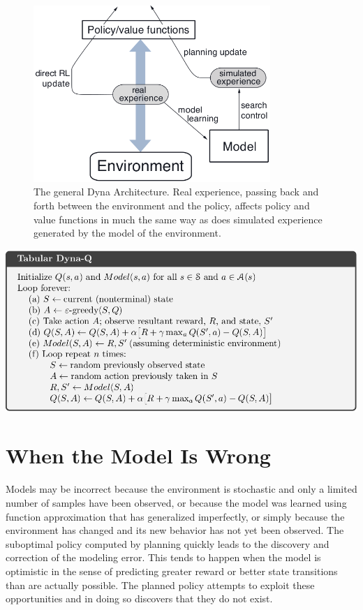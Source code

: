 \begin{figure}[h]
    \centering
    \includegraphics[width=0.8\textwidth]{img/dyna_architecture.png}
    \caption{The general Dyna Architecture.
        Real experience, passing back and forth between the environment and the policy,
        affects policy and value functions in much the same way as does simulated experience
        generated by the model of the environment.}
    \label{fig:dyna_architecture}
\end{figure}

\begin{center}
    \includegraphics[width=\textwidth]{img/alg_tabular_dyna_q.png}
\end{center}


\section{When the Model Is Wrong}
\label{sec:when_the_model_is_wrong}
Models may be incorrect because the environment is stochastic and only a limited number of samples
have been observed, or because the model was learned using function approximation that
has generalized imperfectly, or simply because the environment has changed and its new
behavior has not yet been observed.
The suboptimal policy computed by planning quickly leads to the discovery and correction of the
modeling error.
This tends to happen when the model is optimistic in the sense of predicting greater reward or
better state transitions than are actually possible.
The planned policy attempts to exploit these opportunities and in doing so discovers that they do
not exist.

